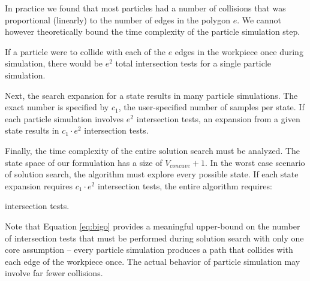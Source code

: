 In practice we found that most particles had a number of collisions that was proportional (linearly) to the number of edges in the polygon $e$. We cannot however theoretically bound the time complexity of the particle simulation step.

If a particle were to collide with each of the $e$ edges in the workpiece once during simulation, there would be $e^2$ total intersection tests for a single particle simulation.

Next, the search expansion for a state results in many particle simulations. The exact number is specified by $c_1$, the user-specified number of samples per state. If each particle simulation involves $e^2$ intersection tests, an expansion from a given state results in $c_1 \cdot e^2$ intersection tests.

Finally, the time complexity of the entire solution search must be analyzed. The state space of our formulation has a size of $V_{concave} + 1$. In the worst case scenario of solution search, the algorithm must explore every possible state. If each state expansion requires $c_1 \cdot e^2$ intersection tests, the entire algorithm requires:

 {
	\label{eq:bigo}
}

intersection tests.

Note that Equation \eqref{eq:bigo} provides a meaningful upper-bound on the number of intersection tests that must be performed during solution search with only one core assumption -- every particle simulation produces a path that collides with each edge of the workpiece once. The actual behavior of particle simulation may involve far fewer collisions.
